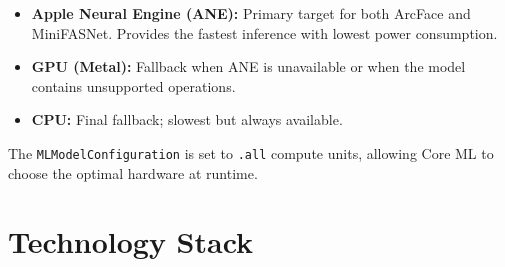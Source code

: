 \documentclass[12pt,a4paper]{report}
\begin{document}
\begin{itemize}[noitemsep]
    \item \textbf{Apple Neural Engine (ANE):} Primary target for both ArcFace and MiniFASNet. Provides the fastest inference with lowest power consumption.
    \item \textbf{GPU (Metal):} Fallback when ANE is unavailable or when the model contains unsupported operations.
    \item \textbf{CPU:} Final fallback; slowest but always available.
\end{itemize}

The \texttt{MLModelConfiguration} is set to \texttt{.all} compute units, allowing Core ML to choose the optimal hardware at runtime.

\chapter{Technology Stack}
\end{document}
